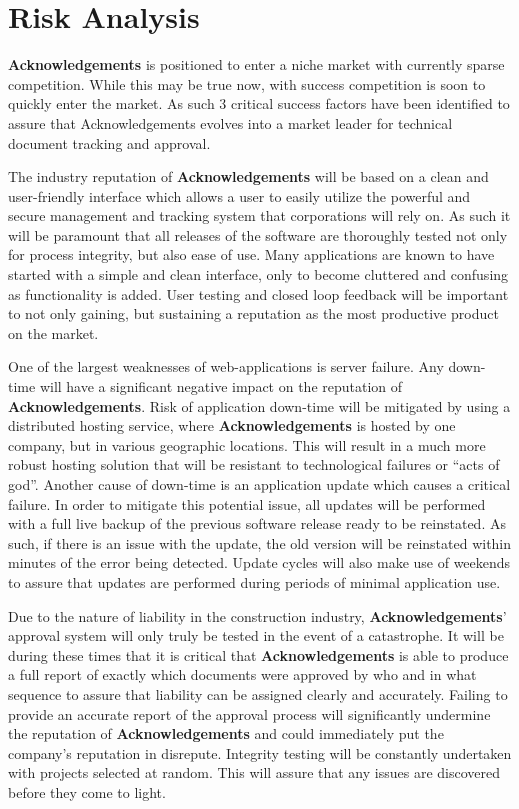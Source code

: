\section{Risk Analysis}

{\bf Acknowledgements} is positioned to enter a niche market with currently sparse competition. While this may be true now, with success competition is soon to quickly enter the market. As such 3 critical success factors have been identified to assure that Acknowledgements evolves into a market leader for technical document tracking and approval.

The industry reputation of {\bf Acknowledgements} will be based on a clean and user-friendly interface which allows a user to easily utilize the powerful and secure management and tracking system that corporations will rely on. As such it will be paramount that all releases of the software are thoroughly tested not only for process integrity, but also ease of use. Many applications are known to have started with a simple and clean interface, only to become cluttered and confusing as functionality is added. User testing and closed loop feedback will be important to not only gaining, but sustaining a reputation as the most productive product on the market.

One of the largest weaknesses of web-applications is server failure. Any down-time will have a significant negative impact on the reputation of {\bf Acknowledgements}. Risk of application down-time will be mitigated by using a distributed hosting service, where {\bf Acknowledgements} is hosted by one company, but in various geographic locations. This will result in a much more robust hosting solution that will be resistant to technological failures or ``acts of god''. Another cause of down-time is an application update which causes a critical failure. In order to mitigate this potential issue, all updates will be performed with a full live backup of the previous software release ready to be reinstated. As such, if there is an issue with the update, the old version will be reinstated within minutes of the error being detected. Update cycles will also make use of weekends to assure that updates are performed during periods of minimal application use.

Due to the nature of liability in the construction industry, {\bf Acknowledgements}' approval system will only truly be tested in the event of a catastrophe. It will be during these times that it is critical that {\bf Acknowledgements} is able to produce a full report of exactly which documents were approved by who and in what sequence to assure that liability can be assigned clearly and accurately. Failing to provide an accurate report of the approval process will significantly undermine the reputation of {\bf Acknowledgements} and could immediately put the company's reputation in disrepute. Integrity testing will be constantly undertaken with projects selected at random. This will assure that any issues are discovered before they come to light.



